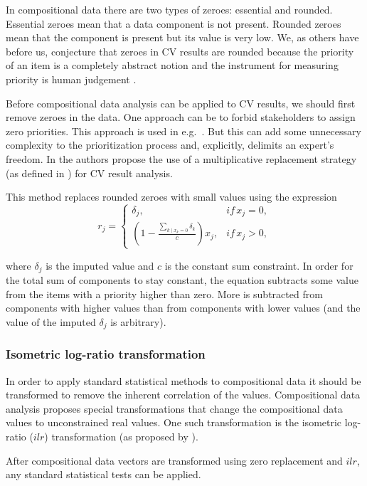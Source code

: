 In compositional data there are two types of zeroes: essential and rounded.
Essential zeroes mean that a data component
is not present. Rounded zeroes mean that the component is present but
its value is very low. We, as others have before us, conjecture that zeroes in CV results are 
rounded because the priority of an item is a completely abstract notion
and the instrument for measuring priority is human judgement \cite{Chatzipetrou2010}.

Before compositional data analysis can be applied to CV results, we should first remove
zeroes in the data. One approach can be to forbid stakeholders
to assign zero priorities. This approach is used in e.g.\ \cite{Pettersson2008}.
But this can add some unnecessary complexity to the prioritization
process and, explicitly, delimits an expert's freedom. 
In \cite{Chatzipetrou2010} the authors propose the use of a multiplicative 
replacement strategy (as defined in \cite{Martin-Fernandez2003}) for CV result analysis.

This method replaces rounded zeroes with small values using the expression
\begin{equation}
r_{j}=\begin{cases}
\delta_{j}, & if\, x_{j}=0,\\
(1-\frac{\sum_{k\mid x_{k}=0}\delta_{k}}{c})x_{j}, & if\, x_{j}>0,\end{cases}\label{eq:zero-replace}
\end{equation}

where $\delta_{j}$ is the imputed value and $c$ is the constant sum constraint.
In order for the total sum of components to stay constant, the equation subtracts 
some value from the items with a priority higher than zero.
More is subtracted from components with higher values than from components with lower 
values (and the value of the imputed $\delta_{j}$ is arbitrary).

\subsubsection{\label{Isometric-Logratio-Transformation}Isometric log-ratio transformation}
In order to apply standard statistical methods to compositional data it should be transformed to remove the inherent correlation of the values.
Compositional data analysis proposes special transformations that change the compositional data values to unconstrained real values.
One such transformation is the isometric log-ratio ($ilr$) transformation (as proposed by \cite{Pawlowsky-Glahn2006,Filzmoser2007a}).



After compositional data vectors are transformed using zero replacement and $ilr$, any standard statistical tests can be applied.